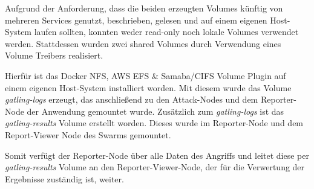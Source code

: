 Aufgrund der Anforderung, dass die beiden erzeugten Volumes künftig von mehreren Services genutzt, beschrieben, gelesen und auf einem eigenen Host-System laufen sollten, konnten weder read-only noch lokale Volumes verwendet werden. 
Stattdessen wurden zwei shared Volumes durch Verwendung eines Volume Treibers realisiert.

Hierfür ist das Docker NFS, AWS EFS \& Samaba/CIFS Volume Plugin auf einem eigenen Host-System installiert worden.
Mit diesem wurde das Volume \textit{gatling-logs} erzeugt, das anschließend zu den Attack-Nodes und dem Reporter-Node der Anwendung gemountet wurde. 
Zusätzlich zum \textit{gatling-logs} ist das \textit{gatling-results} Volume erstellt worden. 
Dieses wurde im Reporter-Node und dem Report-Viewer Node des Swarms gemountet.

Somit verfügt der Reporter-Node über alle Daten des Angriffs und leitet diese per \textit{gatling-results} Volume an den Reporter-Viewer-Node, der für die Verwertung der Ergebnisse zuständig ist, weiter.
